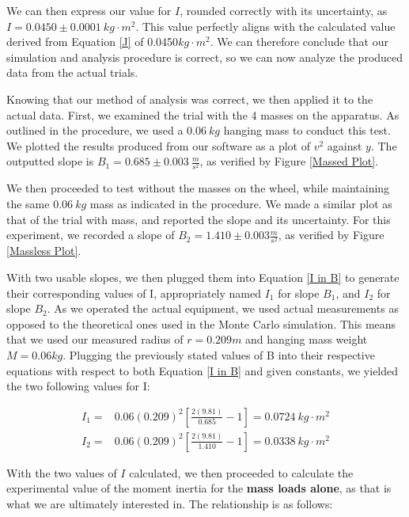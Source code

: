 \documentclass[12pt]{article}
\begin{document}
\indent We can then express our value for $I$, rounded correctly with its uncertainty, as $I=0.0450\pm0.0001\ kg\cdot m^2$. This value perfectly aligns with the calculated value derived from Equation \ref{J} of 0.0450$kg\cdot m^2$. We can therefore conclude that our simulation and analysis procedure is correct, so we can now analyze the produced data from the actual trials. \par

Knowing that our method of analysis was correct, we then applied it to the actual data. First, we examined the trial with the 4 masses on the apparatus. As outlined in the procedure, we used a $0.06\ kg$ hanging mass to conduct this test. We plotted the results produced from our software as a plot of $v^2$ against $y$. The outputted slope is $B_1=0.685\pm0.003\ \frac{m}{s^2}$, as verified by Figure \ref{Massed Plot}. \par

We then proceeded to test without the masses on the wheel, while maintaining the same $0.06\ kg$ mass as indicated in the procedure. We made a similar plot as that of the trial with mass, and reported the slope and its uncertainty. For this experiment, we recorded a slope of $B_2 = 1.410\pm0.003\frac{m}{s^2}$, as verified by Figure \ref{Massless Plot}. \par

With two usable slopes, we then plugged them into Equation \ref{I in B} to generate their corresponding values of I, appropriately named $I_1$ for slope $B_1$, and $I_2$ for slope $B_2$. As we operated the actual equipment, we used actual measurements as opposed to the theoretical ones used in the Monte Carlo simulation. This means that we used our measured radius of $r=0.209m$ and hanging mass weight $M=0.06kg$. Plugging the previously stated values of B into their respective equations with respect to both Equation \ref{I in B} and given constants, we yielded the two following values for I:

\begin{align*}
    I_1 =& 0.06(0.209)^2[\frac{2(9.81)}{0.685}-1]=0.0724\ kg\cdot m^2 \\
    I_2 =& 0.06(0.209)^2[\frac{2(9.81)}{1.410}-1]=0.0338\ kg\cdot m^2
\end{align*}

\indent With the two values of $I$ calculated, we then proceeded to calculate the experimental value of the moment inertia for the \textbf{mass loads alone}, as that is what we are ultimately interested in. The relationship is as follows:
\end{document}
